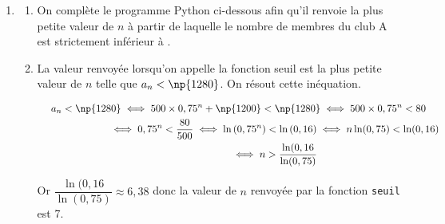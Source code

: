 \begin{enumerate}
\begin{enumerate}
		\item
On peut donc dire qu'à long terme, le nombre de sportifs dans le club A va tendre vers , et donc que le nombre de sportifs dans le club B va tendre vers $\np{3000}-\np{1200}=\np{1800}$.		
	\end{enumerate}
\item 
	\begin{enumerate}
		\item On complète le programme Python ci-dessous afin qu'il renvoie la plus petite valeur de $n$ à partir de laquelle le nombre de membres du club A est strictement inférieur à .


\begin{center}
\end{center}

		\item La valeur renvoyée lorsqu'on appelle la fonction seuil est la plus petite valeur de $n$ telle que $a_n<\np{1280}$. On résout cette inéquation.
		
$\begin{gathered}a_n<\np{1280}
\iff 500\times 0,75^n + \np{1200} < \np{1280}
\iff 500\times 0,75^n < 80\\
\phantom{a_n<\np{1280}}
\iff 0,75^n < \dfrac{80}{500}
\iff \ln\left (0,75^n\right ) < \ln\left (0,16\right )
\iff n\ln(0,75)<\ln(0,16)\\
\phantom{a_n<\np{1280}}
\iff n>\dfrac{\ln(0,16}{\ln(0,75)}\end{gathered}$

Or $\dfrac{\ln(0,16}{\ln(0,75)} \approx 6,38$ donc la valeur de $n$ renvoyée par la fonction \texttt{seuil} est 7.
		
	\end{enumerate}
\end{enumerate}	

\bigskip
